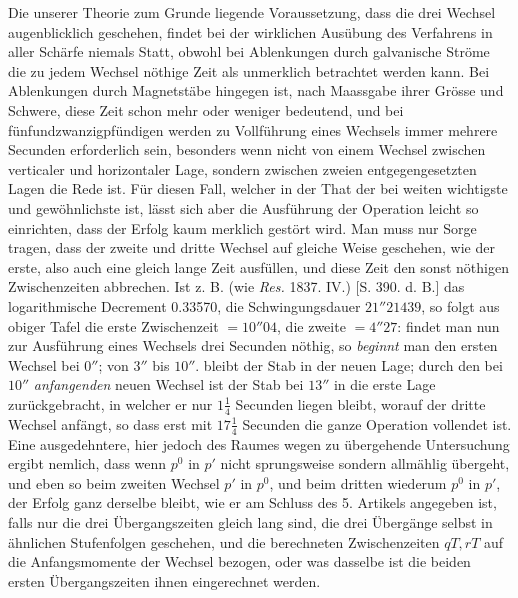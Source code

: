 Die unserer Theorie zum Grunde liegende Voraussetzung, dass die drei Wechsel augenblicklich geschehen, findet bei der wirklichen Ausübung des Verfahrens in aller Schärfe niemals Statt, obwohl bei Ablenkungen durch galvanische Ströme die zu jedem Wechsel nöthige Zeit als unmerklich betrachtet werden kann. Bei Ablenkungen durch Magnetstäbe hingegen ist, nach Maassgabe ihrer Grösse und Schwere, diese Zeit schon mehr oder weniger bedeutend, und bei fünfundzwanzigpfündigen werden zu Vollführung eines Wechsels immer mehrere Secunden erforderlich sein, besonders wenn nicht von einem Wechsel zwischen verticaler und horizontaler Lage, sondern zwischen zweien entgegengesetzten Lagen die Rede ist. Für diesen Fall, welcher in der That der bei weiten wichtigste und gewöhnlichste ist, lässt sich aber die Ausführung der Operation leicht so einrichten, dass der Erfolg kaum merklich gestört wird. Man muss nur Sorge tragen, dass der zweite und dritte Wechsel auf gleiche Weise geschehen, wie der erste, also auch eine gleich lange Zeit ausfüllen, und diese Zeit den sonst nöthigen Zwischenzeiten abbrechen. Ist z. B. (wie \textit{Res.} 1837. IV.) [S. 390. d. B.] das logarithmische Decrement 0.33570, die Schwingungsdauer $21''21439$, so folgt aus obiger Tafel die erste Zwischenzeit $=10''04$, die zweite $=4''27$: findet man nun zur Ausführung eines Wechsels drei Secunden nöthig, so \textit{beginnt} man den ersten Wechsel bei $0''$; von $3''$ bis $10''$. bleibt der Stab in der neuen Lage; durch den bei $10''$ \textit{anfangenden} neuen Wechsel ist der Stab bei $13''$ in die erste Lage zurückgebracht, in welcher er nur $1\tfrac{1}{4}$ Secunden liegen bleibt, worauf der dritte Wechsel anfängt, so dass erst mit $17\tfrac{1}{4}$ Secunden die ganze Operation vollendet ist. Eine ausgedehntere, hier jedoch des Raumes wegen zu übergehende Untersuchung ergibt nemlich, dass wenn $p^0$ in $p'$ nicht sprungsweise sondern allmählig übergeht, und eben so beim zweiten Wechsel $p'$ in $p^0$, und beim dritten wiederum $p^0$ in $p'$, der Erfolg ganz derselbe bleibt, wie er am Schluss des 5. Artikels angegeben ist, falls nur die drei Übergangszeiten gleich lang sind, die drei Übergänge selbst in ähnlichen Stufenfolgen geschehen, und die berechneten Zwischenzeiten $qT,rT$ auf die Anfangsmomente der Wechsel bezogen, oder was dasselbe ist die beiden ersten Übergangszeiten ihnen eingerechnet werden.

